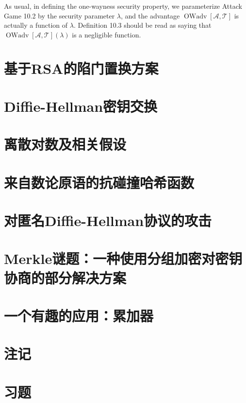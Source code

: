 As usual, in defining the one-wayness security property, we parameterize Attack Game 10.2 by the security parameter $\lambda$, and the advantage $\operatorname{OWadv}[\mathcal{A}, \mathcal{T}]$ is actually a function of $\lambda$. Definition 10.3 should be read as saying that $\operatorname{OWadv}[\mathcal{A}, \mathcal{T}](\lambda)$ is a negligible function.




\section{基于RSA的陷门置换方案}\label{10.3}
\section{Diffie-Hellman密钥交换}\label{10.4}
\section{离散对数及相关假设}\label{10.5}
\section{来自数论原语的抗碰撞哈希函数}\label{10.6}
\section{对匿名Diffie-Hellman协议的攻击}\label{10.7}
\section{Merkle谜题：一种使用分组加密对密钥协商的部分解决方案}\label{10.8}
\section{一个有趣的应用：累加器}\label{10.9}
\section{注记}\label{10.10}
\section{习题}\label{10.11}

